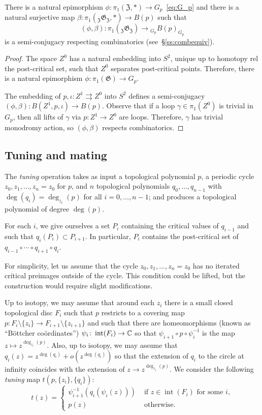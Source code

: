 \documentclass{amsart}
\begin{document}
\begin{thm}\label{thm:GrBsOutOfSR}
  There is a natural epimorphism $\phi\colon \pi_1(\mathfrak Z,*)\to
  G_p$~\eqref{eq:G_p} and there is a natural surjective map $\beta\colon
  \pi_1({}_{\mathfrak Z}{\mathfrak G}_{\mathfrak Z},*)\to B(p)$ such
  that
  \[(\phi, \beta)\colon \pi_1({}_{\mathfrak Z}{\mathfrak G}_{\mathfrak
    Z})\to {}_{G_p}B(p)_{G_p}
  \]
  is a semi-conjugacy respecting combinatorics (see~\S\ref{ss:combequiv}).
\end{thm}
\begin{proof}
  The space $Z^0$ has a natural embedding into $S^2$, unique up to homotopy
  rel the post-critical set, such that $Z^0$ separates post-critical
  points. Therefore, there is a natural epimorphism
  $\phi\colon\pi_1(\mathfrak G)\to G_p$.

  The embedding of $p,\iota\colon Z^1\rightrightarrows Z^0$ into $S^2$
  defines a semi-conjugacy $(\phi, \beta)\colon B(Z^1,p,\iota)\to
  B(p)$. Observe that if a loop $\gamma\in \pi_1(Z^0)$ is trivial in $G_p$,
  then all lifts of $\gamma$ via $p\colon Z^1\to Z^0$ are loops. Therefore,
  $\gamma$ has trivial monodromy action, so $(\phi, \beta)$ respects
  combinatorics.
\end{proof}

\subsection{Tuning and mating}
The \emph{tuning} operation takes as input a topological polynomial
$p$, a periodic cycle $z_0,z_1,\dots,z_n=z_0$ for $p$, and $n$
topological polynomials $q_0,\dots,q_{n-1}$ with
$\deg(q_i)=\deg_{z_i}(p)$ for all $i=0,\dots,n-1$; and produces a
topological polynomial of degree $\deg(p)$.

For each $i$, we give ourselves a set $P_i$ containing the critical values
of $q_{i-1}$ and such that $q_i(P_i)\subset P_{i+1}$. In particular, $P_i$
contains the post-critical set of $q_{i-1}\circ\cdots\circ q_{i+1}\circ
q_i$.

For simplicity, let us assume that the cycle $z_0,z_1,\dots,z_n=z_0$ has no
iterated critical preimages outside of the cycle. This condition could be lifted,
but the construction would require slight modifications.

Up to isotopy, we may assume that around each $z_i$ there is a small closed
topological disc $F_i$ such that $p$ restricts to a covering map $p\colon
F_i\setminus \{z_i\}\to F_{i+1}\setminus \{z_{i+1}\}$ and such that there
are homeomorphisms (known as ``B\"ottcher co\"ordinates'') $\psi_i\colon
\operatorname{int} (F_i)\to{\mathbb C}$ so that $\psi_{i+1}\circ p\circ\psi_i^{-1}$
is the map $z\mapsto z^{\deg_{z_i}(p)}$. Also, up to isotopy, we may assume
that $q_i(z)=z^{\deg (q_i)} + o(z^{\deg (q_i)})$ so that the extension of
$q_i$ to the circle at infinity coincides with the extension of $z\to
z^{\deg_{z_i} (p)} $. We consider the following \emph{tuning} map
$t(p,\{z_i\},\{q_i\})$:
\[t(z)=\begin{cases}
  \psi_{i+1}^{-1}(q_i(\psi_i(z))) & \text{ if $z\in \operatorname{int}(F_i)$ for some $i$},\\
  p(z) & \text{ otherwise}.
\end{cases}\]
\end{document}
